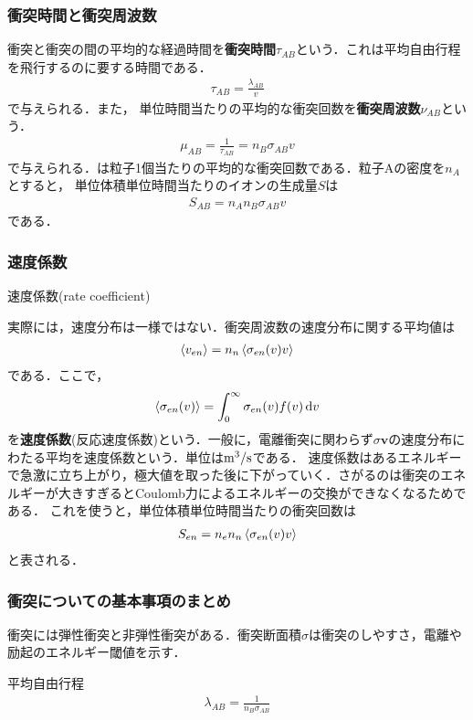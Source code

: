 \documentclass{report}
\begin{document}
\subsubsection{衝突時間と衝突周波数}
衝突と衝突の間の平均的な経過時間を\textbf{衝突時間}$\tau_{AB}$という．これは平均自由行程を飛行するのに要する時間である．
\begin{align}
  \tau_{AB} = \frac{\lambda_{AB}}{v} \label{eq:collision_time}
\end{align}
で与えられる．また，
単位時間当たりの平均的な衝突回数を\textbf{衝突周波数}$\nu_{AB}$という．
\begin{align}
  \mu_{AB} = \frac{1}{\tau_{AB}} = n_B \sigma_{AB} v \label{eq:collision_frequency}
\end{align}
で与えられる．は粒子1個当たりの平均的な衝突回数である．粒子Aの密度を$n_A$とすると，
単位体積単位時間当たりのイオンの生成量$S$は
\begin{align}
  S_{AB} = n_A n_B \sigma_{AB} v
\end{align}
である．

\subsubsection{速度係数}
速度係数(rate coefficient)

実際には，速度分布は一様ではない．衝突周波数の速度分布に関する平均値は
\begin{align}
  \ev{v_{en}} = n_n \ev{\sigma_{en}(v)v}
\end{align}
である．ここで，
\begin{align}
  \ev{\sigma_{en}(v)} = \int_0^{\infty} \sigma_{en}(v)f(v)\dd{v}
\end{align}
を\textbf{速度係数}(反応速度係数)という．一般に，電離衝突に関わらず$\sigma \bm{v}$の速度分布にわたる平均を速度係数という．単位は$\mathrm{m^3/s}$である．
速度係数はあるエネルギーで急激に立ち上がり，極大値を取った後に下がっていく．さがるのは衝突のエネルギーが大きすぎるとCoulomb力によるエネルギーの交換ができなくなるためである．
これを使うと，単位体積単位時間当たりの衝突回数は
\begin{align}
  S_{en} = n_e n_n \ev{\sigma_{en}(v)v}
\end{align}
と表される．

\subsubsection{衝突についての基本事項のまとめ}
衝突には弾性衝突と非弾性衝突がある．衝突断面積$\sigma$は衝突のしやすさ，電離や励起のエネルギー閾値を示す．
\begin{itembox}[l]{平均自由行程}
  \begin{align}
    \lambda_{AB} = \frac{1}{n_B \sigma_{AB}}
  \end{align}
\end{itembox}
\end{document}
